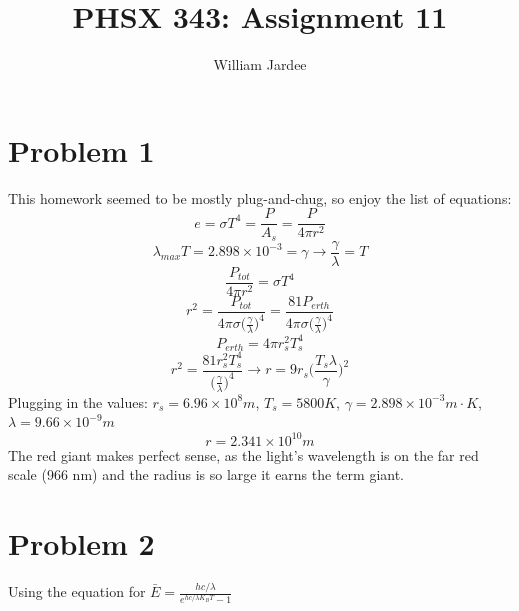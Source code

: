 \documentclass[11pt]{article}
\begin{document}
\date{}

\title{PHSX 343: Assignment 11}

\author{William Jardee}

\maketitle


\section*{Problem 1}
    This homework seemed to be mostly plug-and-chug, so enjoy the list of equations:
    \[e = \sigma T^4 = \frac{P}{A_s} = \frac{P}{4 \pi r^2}\]
    \[\lambda _{max} T = 2.898 \times 10^{-3} = \gamma \rightarrow \frac{\gamma}{\lambda} = T\]
    \[\frac{P_{tot}}{4 \pi r^2} = \sigma T^4\]
    \[r^2 = \frac{P_{tot}}{4 \pi \sigma \Big(\frac{\gamma}{\lambda}\Big)^4} = \frac{81P_{erth}}{4 \pi \sigma \Big(\frac{\gamma}{\lambda}\Big)^4}\]
    \[P_{erth} = 4 \pi r_s^2 T_s^4\]
    \[r^2 = \frac{81 r_s^2 T_s^4}{\Big(\frac{\gamma}{\lambda}\Big)^4} \rightarrow r = 9r_s \Big(\frac{T_s \lambda}{\gamma}\Big)^2\]
    Plugging in the values: $r_s = 6.96 \times 10^8 m$, $T_s = 5800 K$, $\gamma =  2.898 \times 10^{-3} m \cdot K$, $\lambda = 9.66 \times 10^{-9} m$
    \[\boxed{r = 2.341 \times 10^{10} m}\]
    The red giant makes perfect sense, as the light's wavelength is on the far red scale (966 nm) and the radius is so large it earns the term giant. 
\newpage

\section*{Problem 2}
    Using the equation for $\bar{E} = \frac{hc/ \lambda }{e^{hc/ \lambda K_B T}-1}$
\end{document}
